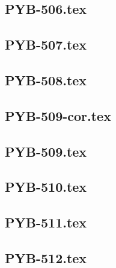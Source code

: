 \renewcommand{\xxexo}{PYB-506.tex} 
\subsection*{\xxexo} 
\graphicspath{{../../exospython_bases/equadiffs/\xxexo/}}
 
 
\renewcommand{\xxexo}{PYB-507.tex} 
\subsection*{\xxexo} 
\graphicspath{{../../exospython_bases/equadiffs/\xxexo/}}
 
 
\renewcommand{\xxexo}{PYB-508.tex} 
\subsection*{\xxexo} 
\graphicspath{{../../exospython_bases/equadiffs/\xxexo/}}
 
 
\renewcommand{\xxexo}{PYB-509-cor.tex} 
\subsection*{\xxexo} 
\graphicspath{{../../exospython_bases/equadiffs/\xxexo/}}
 
 
\renewcommand{\xxexo}{PYB-509.tex} 
\subsection*{\xxexo} 
\graphicspath{{../../exospython_bases/equadiffs/\xxexo/}}
 
 
\renewcommand{\xxexo}{PYB-510.tex} 
\subsection*{\xxexo} 
\graphicspath{{../../exospython_bases/equadiffs/\xxexo/}}
 
 
\renewcommand{\xxexo}{PYB-511.tex} 
\subsection*{\xxexo} 
\graphicspath{{../../exospython_bases/equadiffs/\xxexo/}}
 
 
\renewcommand{\xxexo}{PYB-512.tex} 
\subsection*{\xxexo} 
\graphicspath{{../../exospython_bases/equadiffs/\xxexo/}}
 
 
